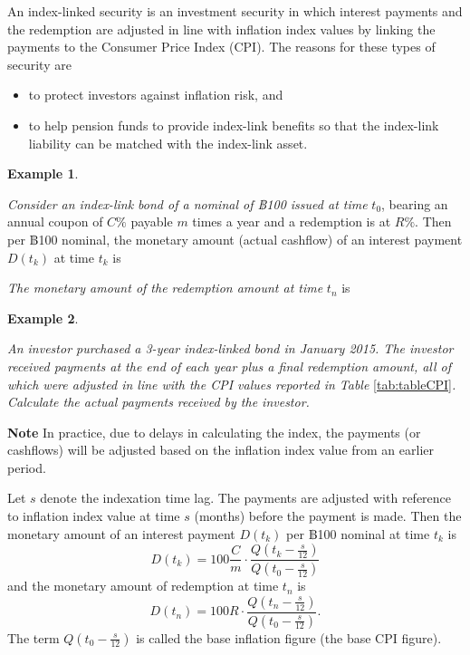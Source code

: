 \documentclass[
]{book}
\theoremstyle{definition}
\theoremstyle{definition}
\newtheorem{example}{Example}[chapter]
\theoremstyle{definition}
\theoremstyle{definition}
\theoremstyle{remark}
\begin{document}
An index-linked security is an investment security in which interest
payments and the redemption are adjusted in line with inflation index
values by linking the payments to the Consumer Price Index (CPI). The
reasons for these types of security are

\begin{itemize}
\item
  to protect investors against inflation risk, and
\item
  to help pension funds to provide index-link benefits so that the
  index-link liability can be matched with the index-link asset.
\end{itemize}

\begin{example}
\protect\hypertarget{exm:unlabeled-div-63}{}\label{exm:unlabeled-div-63}

\emph{Consider an index-link bond of a nominal of ฿100 issued at time} \(t_0\),
bearing an annual coupon of \(C\%\) payable \(m\) times a year and a
redemption is at \(R\%\). Then per ฿100 nominal, the monetary amount
(actual cashflow) of an interest payment \(D(t_k)\) at time \(t_k\) is

\emph{The monetary amount of the redemption amount at time} \(t_n\) is

\end{example}

\begin{example}
\protect\hypertarget{exm:exampleILB}{}\label{exm:exampleILB}

\emph{An investor purchased a 3-year index-linked bond in January 2015. The
investor received payments at the end of each year plus a final
redemption amount, all of which were adjusted in line with the CPI
values reported in Table} \ref{tab:tableCPI}\emph{. Calculate the actual
payments received by the investor.}

\end{example}

\textbf{Note} In practice, due to delays in calculating the index, the
payments (or cashflows) will be adjusted based on the inflation index
value from an earlier period.

Let \(s\) denote the indexation time lag. The payments are adjusted with
reference to inflation index value at time \(s\) (months) before the
payment is made. Then the monetary amount of an interest payment
\(D(t_k)\) per ฿100 nominal at time \(t_k\) is
\[\displaystyle D(t_k) = 100 \frac{C}{m} \cdot \frac{Q(t_k - \frac{s}{12})}{Q(t_0 - \frac{s}{12})}\]
and the monetary amount of redemption at time \(t_n\) is
\[D(t_n) = 100 R \cdot \frac{Q(t_n - \frac{s}{12})}{Q(t_0 - \frac{s}{12})}.\]
The term \(Q(t_0 - \frac{s}{12})\) is called the base inflation figure
(the base CPI figure).
\end{document}
